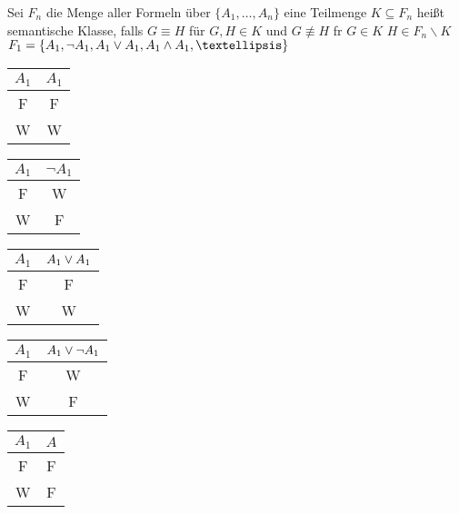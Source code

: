 

Sei $F_n$ die Menge aller Formeln über $\{A_1, …, A_n\}$ eine Teilmenge $K \subseteq F_n$ heißt semantische Klasse, falls $G \equiv H$ für $G, H \in K$ und $G \not\equiv H$ fr $G\in K$ \hspace{.5cm} $H \in F_n \backslash K$\\

\beispiel{}
$F_1 = \{A_1, \neg A_1, A_1 \OR A_1, A_1 \AND A_1, … \}$\\

\begin{minipage}{0.15\textwidth}
\begin{tabular}{c|c}
$A_1$ & $A_1$\\
\hline
F & F\\
W & W\\
\end{tabular}
\end{minipage}
\hfill
\begin{minipage}{0.15\textwidth}
\begin{tabular}{c|c}
$A_1$ & $\neg A_1$ \\
\hline
F & W\\
W & F\\
\end{tabular}
\end{minipage}
\hfill
\begin{minipage}{0.15\textwidth}
\begin{tabular}{c|c}
$A_1$ & $A_1 \vee A_1$\\
\hline
F & F\\
W & W\\
\end{tabular}
\end{minipage}
\hfill
\begin{minipage}{0.15\textwidth}
\begin{tabular}{c|c}
$A_1$ & $A_1 \vee \neg A_1$\\
\hline
F & W\\
W & F\\
\end{tabular}
\end{minipage}
\hfill
\begin{minipage}{0.15\textwidth}
\begin{tabular}{c|c}
$A_1$ & $A$\\
\hline
F & F\\
W & F\\
\end{tabular}
\end{minipage}\\
